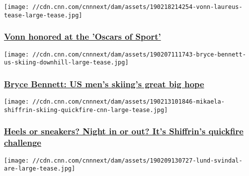 \texttt{[image: //cdn.cnn.com/cnnnext/dam/assets/190218214254-vonn-laureus-tease-large-tease.jpg]}

\hypertarget{vonn-honored-at-the-oscars-of-sport}{%
\subsubsection{\texorpdfstring{\href{/2019/02/18/sport/laureus-world-sports-awards-lindsey-vonn-simone-biles-novak-djokovic-spt-intl/index.html}{Vonn
honored at the 'Oscars of
Sport'}}{Vonn honored at the 'Oscars of Sport'}}\label{vonn-honored-at-the-oscars-of-sport}}

\href{/2019/02/07/sport/bryce-bennett-us-skiing-downhill-world-cup-alpine-edge-spt-intl/index.html}{}

\texttt{[image: //cdn.cnn.com/cnnnext/dam/assets/190207111743-bryce-bennett-us-skiing-downhill-large-tease.jpg]}

\hypertarget{bryce-bennett-us-mens-skiings-great-big-hope}{%
\subsubsection{\texorpdfstring{\href{/2019/02/07/sport/bryce-bennett-us-skiing-downhill-world-cup-alpine-edge-spt-intl/index.html}{Bryce
Bennett: US men's skiing's great big
hope}}{Bryce Bennett: US men's skiing's great big hope}}\label{bryce-bennett-us-mens-skiings-great-big-hope}}

\href{/2019/02/13/sport/mikaela-shiffrin-quickfire-answers-spt-intl/index.html}{}

\texttt{[image: //cdn.cnn.com/cnnnext/dam/assets/190213101846-mikaela-shiffrin-skiing-quickfire-cnn-large-tease.jpg]}

\hypertarget{heels-or-sneakers-night-in-or-out-its-shiffrins-quickfire-challenge}{%
\subsubsection{\texorpdfstring{\href{/2019/02/13/sport/mikaela-shiffrin-quickfire-answers-spt-intl/index.html}{Heels
or sneakers? Night in or out? It's Shiffrin's quickfire
challenge}}{Heels or sneakers? Night in or out? It's Shiffrin's quickfire challenge}}\label{heels-or-sneakers-night-in-or-out-its-shiffrins-quickfire-challenge}}

\href{/2019/02/09/sport/aksel-lund-svindal-world-ski-championships-downhill-spt-intl/index.html}{}

\texttt{[image: //cdn.cnn.com/cnnnext/dam/assets/190209130727-lund-svindal-are-large-tease.jpg]}

